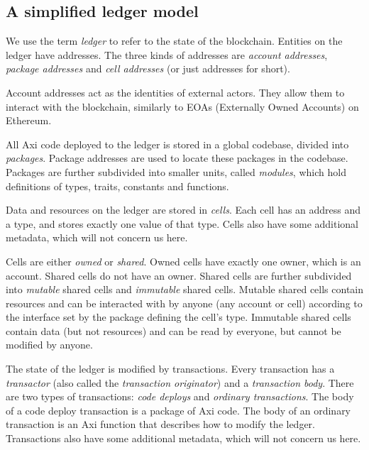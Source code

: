 \subsection{A simplified ledger model}

We use the term \textit{ledger} to refer to the state of the blockchain. Entities on the ledger have addresses. The three kinds of addresses are \textit{account addresses}, \textit{package addresses} and \textit{cell addresses} (or just addresses for short).

Account addresses act as the identities of external actors. They allow them to interact with the blockchain, similarly to EOAs (Externally Owned Accounts) on Ethereum.

All Axi code deployed to the ledger is stored in a global codebase, divided into \textit{packages}. Package addresses are used to locate these packages in the codebase. Packages are further subdivided into smaller units, called \textit{modules}, which hold definitions of types, traits, constants and functions.

Data and resources on the ledger are stored in \textit{cells}. Each cell has an address and a type, and stores exactly one value of that type. Cells also have some additional metadata, which will not concern us here.

Cells are either \textit{owned} or \textit{shared}. Owned cells have exactly one owner, which is an account. Shared cells do not have an owner. Shared cells are further subdivided into \textit{mutable} shared cells and \textit{immutable} shared cells. Mutable shared cells contain resources and can be interacted with by anyone (any account or cell) according to the interface set by the package defining the cell's type. Immutable shared cells contain data (but not resources) and can be read by everyone, but cannot be modified by anyone.

The state of the ledger is modified by transactions. Every transaction has a \textit{transactor} (also called the \textit{transaction originator}) and a \textit{transaction body}. There are two types of transactions: \textit{code deploys} and \textit{ordinary transactions}. The body of a code deploy transaction is a package of Axi code. The body of an ordinary transaction is an Axi function that describes how to modify the ledger. Transactions also have some additional metadata, which will not concern us here.